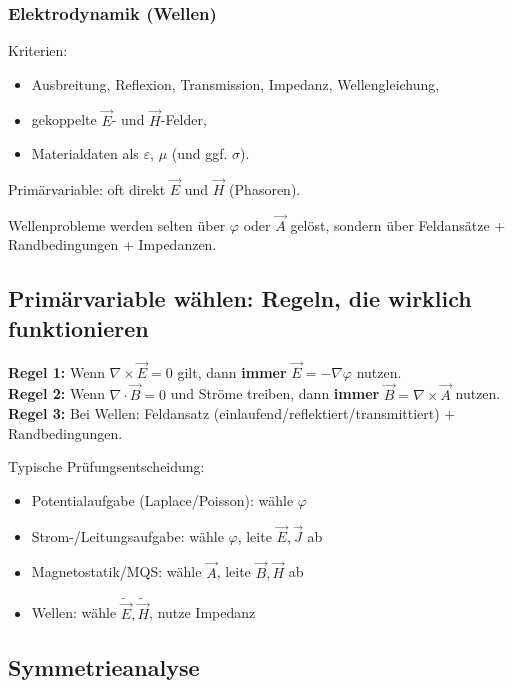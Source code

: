 \documentclass[a4paper]{article}
\newcommand{\imp}[1]{{\color{accent}\bfseries #1}}
\newcommand{\divg}{\nabla\cdot}
\renewcommand{\curl}{\nabla\times}
\newcommand{\E}{\vec E}
\newcommand{\Hf}{\vec H}
\newcommand{\B}{\vec B}
\newcommand{\J}{\vec J}
\newcommand{\A}{\vec A}
\newcommand{\eps}{\varepsilon}
\begin{document}
\subsubsection{Elektrodynamik (Wellen)}
Kriterien:
\begin{itemize}
  \item Ausbreitung, Reflexion, Transmission, Impedanz, Wellengleichung,
  \item gekoppelte $\E$- und $\Hf$-Felder,
  \item Materialdaten als $\eps$, $\mu$ (und ggf. $\sigma$).
\end{itemize}

Primärvariable: oft direkt $\E$ und $\Hf$ (Phasoren).

\begin{merke}
Wellenprobleme werden selten über $\varphi$ oder $\A$ gelöst, sondern über Feldansätze + Randbedingungen + Impedanzen.
\end{merke}

\subsection{Primärvariable wählen: Regeln, die wirklich funktionieren}

\begin{schema}
\imp{Regel 1:} Wenn $\curl \E = 0$ gilt, dann \imp{immer} $\E=-\nabla\varphi$ nutzen.\\
\imp{Regel 2:} Wenn $\divg \B=0$ und Ströme treiben, dann \imp{immer} $\B=\curl \A$ nutzen.\\
\imp{Regel 3:} Bei Wellen: Feldansatz (einlaufend/reflektiert/transmittiert) + Randbedingungen.
\end{schema}

Typische Prüfungsentscheidung:
\begin{itemize}
  \item Potentialaufgabe (Laplace/Poisson): wähle $\varphi$
  \item Strom-/Leitungsaufgabe: wähle $\varphi$, leite $\E,\J$ ab
  \item Magnetostatik/MQS: wähle $\A$, leite $\B,\Hf$ ab
  \item Wellen: wähle $\tilde{\E},\tilde{\Hf}$, nutze Impedanz
\end{itemize}

\subsection{Symmetrieanalyse}
\end{document}
